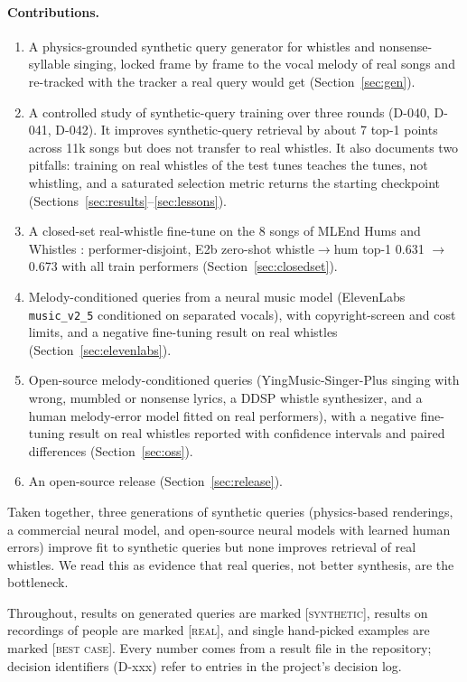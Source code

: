 \documentclass[11pt]{article}
\newcommand{\syn}{\textsc{[synthetic]}}
\newcommand{\real}{\textsc{[real]}}
\newcommand{\best}{\textsc{[best case]}}
\begin{document}
\paragraph{Contributions.}
\begin{enumerate}
\item A physics-grounded synthetic query generator for whistles and nonsense-syllable singing, locked frame by frame to the vocal melody of real songs and re-tracked with the tracker a real query would get (Section~\ref{sec:gen}).
\item A controlled study of synthetic-query training over three rounds (D-040, D-041, D-042). It improves synthetic-query retrieval by about 7 top-1 points across 11k songs but does not transfer to real whistles. It also documents two pitfalls: training on real whistles of the test tunes teaches the tunes, not whistling, and a saturated selection metric returns the starting checkpoint (Sections~\ref{sec:results}--\ref{sec:lessons}).
\item A closed-set real-whistle fine-tune on the 8 songs of MLEnd Hums and Whistles \citep{mlend}: performer-disjoint, E2b zero-shot whistle$\to$hum top-1 0.631 $\to$ 0.673 with all train performers (Section~\ref{sec:closedset}).
\item Melody-conditioned queries from a neural music model (ElevenLabs \texttt{music\_v2\_5} conditioned on separated vocals), with copyright-screen and cost limits, and a negative fine-tuning result on real whistles (Section~\ref{sec:elevenlabs}).
\item Open-source melody-conditioned queries (YingMusic-Singer-Plus singing with wrong, mumbled or nonsense lyrics, a DDSP whistle synthesizer, and a human melody-error model fitted on real performers), with a negative fine-tuning result on real whistles reported with confidence intervals and paired differences (Section~\ref{sec:oss}).
\item An open-source release (Section~\ref{sec:release}).
\end{enumerate}

Taken together, three generations of synthetic queries (physics-based renderings, a commercial neural model, and open-source neural models with learned human errors) improve fit to synthetic queries but none improves retrieval of real whistles. We read this as evidence that real queries, not better synthesis, are the bottleneck.

Throughout, results on generated queries are marked \syn, results on recordings of people are marked \real, and single hand-picked examples are marked \best. Every number comes from a result file in the repository; decision identifiers (D-xxx) refer to entries in the project's decision log.
\end{document}
